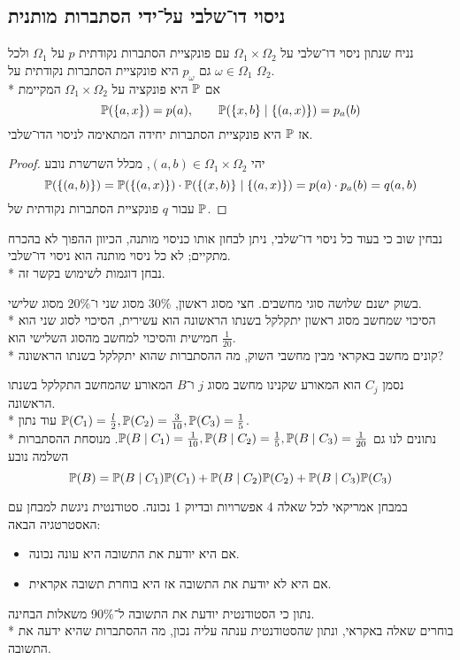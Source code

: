 \subsection{ניסוי דו־שלבי על־ידי הסתברות מותנית}
\begin{proposition}
	נניח שנתון ניסוי דו־שלבי על $\Omega_1 \times \Omega_2$ עם פונקציית הסתברות נקודתית $p$ על $\Omega_1$ ולכל $\omega \in \Omega_1$ גם $p_\omega$ היא פונקציית הסתברות נקודתית על $\Omega_2$. \\*
	אם $\mathbb{P}$ היא פונקציה על $\Omega_1 \times \Omega_2$ המקיימת
	\[
		\mathbb{P}(\{a, x\}) = p(a),
		\qquad
		\mathbb{P}(\{ x, b \} \mid \{ (a, x) \}) = p_a(b)
	\]
	אז $\mathbb{P}$ היא פונקציית הסתברות יחידה המתאימה לניסוי הדו־שלבי.
\end{proposition}
\begin{proof}
	יהי $(a, b) \in \Omega_1 \times \Omega_2$, מכלל השרשרת נובע
	\[
		\mathbb{P}(\{(a, b)\})
		= \mathbb{P}(\{(a, x)\}) \cdot \mathbb{P}(\{(x, b)\} \mid \{(a, x)\})
		= p(a) \cdot p_a(b)
		= q(a, b)
	\]
	עבור $q$ פונקציית הסתברות נקודתית של $\mathbb{P}$.
\end{proof}
נבחין שוב כי בעוד כל ניסוי דו־שלבי, ניתן לבחון אותו כניסוי מותנה, הכיוון ההפוך לא בהכרח מתקיים; לא כל ניסוי מותנה הוא ניסוי דו־שלבי. \\*
נבחן דוגמות לשימוש בקשר זה.
\begin{exercise}
	בשוק ישנם שלושה סוגי מחשבים. חצי מסוג ראשון, 30\% מסוג שני ו־20\% מסוג שלישי. \\*
	הסיכוי שמחשב מסוג ראשון יתקלקל בשנתו הראשונה הוא עשירית, הסיכוי לסוג שני הוא חמישית והסיכוי למחשב מהסוג השלישי הוא $\frac{1}{20}$. \\*
	קונים מחשב באקראי מבין מחשבי השוק, מה ההסתברות שהוא יתקלקל בשנתו הראשונה?
\end{exercise}
\begin{solution}
	נסמן $C_j$ הוא המאורע שקנינו מחשב מסוג $j$ ו־$B$ המאורע שהמחשב התקלקל בשנתו הראשונה. \\*
	עוד נתון $\mathbb{P}(C_1) = \frac{l}{2}, \mathbb{P}(C_2) = \frac{3}{10}, \mathbb{P}(C_3) = \frac{1}{5}$. \\*
	נתונים לנו גם $\mathbb{P}(B \mid C_1) = \frac{1}{10}, \mathbb{P}(B \mid C_2) = \frac{1}{5}, \mathbb{P}(B \mid C_3) = \frac{1}{20}$.
	מנוסחת ההסתברות השלמה נובע
	\[
		\mathbb{P}(B) = \mathbb{P}(B \mid C_1) \mathbb{P}(C_1) + \mathbb{P}(B \mid C_2) \mathbb{P}(C_2) + \mathbb{P}(B \mid C_3) \mathbb{P}(C_3)
	\]
\end{solution}
\begin{exercise}
	במבחן אמריקאי לכל שאלה 4 אפשרויות ובדיוק 1 נכונה.
	סטודנטית ניגשת למבחן עם האסטרטגיה הבאה:
	\begin{itemize}
		\item אם היא יודעת את התשובה היא עונה נכונה.
		\item אם היא לא יודעת את התשובה אז היא בוחרת תשובה אקראית.
	\end{itemize}
	נתון כי הסטודנטית יודעת את התשובה ל־90\% משאלות הבחינה. \\*
	בוחרים שאלה באקראי, ונתון שהסטודנטית ענתה עליה נכון, מה ההסתברות שהיא ידעה את התשובה.
\end{exercise}
